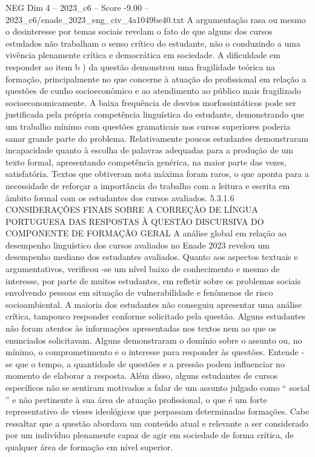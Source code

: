 \begin{textsample}{NEG Dim 4 – 2023\_c6 – Score -9.00 – 2023\_c6/enade\_2023\_eng\_civ\_4a1049be40.txt}
A argumentação rasa ou mesmo o desinteresse por temas sociais revelam o fato de que alguns dos cursos estudados não trabalham o senso crítico do estudante, não o conduzindo a uma vivência plenamente crítica e democrática em sociedade.
A dificuldade em responder ao item b ) da questão demonstrou uma fragilidade teórica na formação, principalmente no que concerne à atuação do profissional em relação a questões de cunho socioeconômico e ao atendimento ao público mais fragilizado socioeconomicamente.
A baixa frequência de desvios morfossintáticos pode ser justificada pela própria competência linguística do estudante, demonstrando que um trabalho mínimo com questões gramaticais nos cursos superiores poderia sanar grande parte do problema.
Relativamente poucos estudantes demonstraram incapacidade quanto à escolha de palavras adequadas para a produção de um texto formal, apresentando competência genérica, na maior parte das vezes, satisfatória.
Textos que obtiveram nota máxima foram raros, o que aponta para a necessidade de reforçar a importância do trabalho com a leitura e escrita em âmbito formal com os estudantes dos cursos avaliados. 5.3.1.6 CONSIDERAÇÕES FINAIS SOBRE A CORREÇÃO DE LÍNGUA PORTUGUESA DAS RESPOSTAS À QUESTÃO DISCURSIVA DO COMPONENTE DE FORMAÇÃO GERAL A análise global em relação ao desempenho linguístico dos cursos avaliados no Enade 2023 revelou um desempenho mediano dos estudantes avaliados.
Quanto aos aspectos textuais e argumentativos, verificou -se um nível baixo de conhecimento e mesmo de interesse, por parte de muitos estudantes, em refletir sobre os problemas sociais envolvendo pessoas em situação de vulnerabilidade e fenômenos de risco socioambiental.
A maioria dos estudantes não conseguiu apresentar uma análise crítica, tampouco responder conforme solicitado pela questão.
Alguns estudantes não foram atentos às informações apresentadas nos textos nem ao que os enunciados solicitavam.
Alguns demonstraram o domínio sobre o assunto ou, no mínimo, o comprometimento e o interesse para responder às questões.
Entende -se que o tempo, a quantidade de questões e a pressão podem influenciar no momento de elaborar a resposta.
Além disso, alguns estudantes de cursos específicos não se sentiram motivados a falar de um assunto julgado como “ social ” e não pertinente à sua área de atuação profissional, o que é um forte representativo de vieses ideológicos que perpassam determinadas formações.
Cabe ressaltar que a questão abordava um conteúdo atual e relevante a ser considerado por um indivíduo plenamente capaz de agir em sociedade de forma crítica, de qualquer área de formação em nível superior.

\end{textsample}
